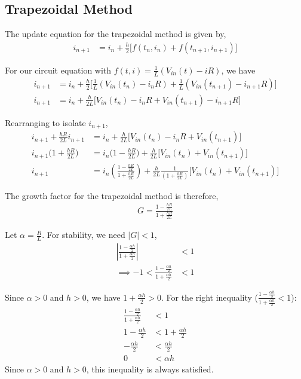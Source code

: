 \documentclass[12pt]{article}
\newcommand{\brak}[1]{\ensuremath{\left(#1\right)}}
\begin{document}
\subsection{Trapezoidal Method}
The update equation for the trapezoidal method is given by,
\begin{align*}
i_{n+1} &= i_n + \frac{h}{2} \Big[ f(t_n, i_n) + f(t_{n+1}, i_{n+1}) \Big]
\end{align*}

For our circuit equation with $f(t, i) = \frac{1}{L}(V_{in}(t) - iR)$, we have
\begin{align*}
i_{n+1} &= i_n + \frac{h}{2} \Big[ \frac{1}{L}(V_{in}(t_n) - i_n R) + \frac{1}{L}(V_{in}(t_{n+1}) - i_{n+1} R) \Big] \\
i_{n+1} &= i_n + \frac{h}{2L} \Big[ V_{in}(t_n) - i_n R + V_{in}(t_{n+1}) - i_{n+1} R \Big]
\end{align*}

Rearranging to isolate $i_{n+1}$,
\begin{align*}
i_{n+1} + \frac{hR}{2L}i_{n+1} &= i_n + \frac{h}{2L} \Big[ V_{in}(t_n) - i_n R + V_{in}(t_{n+1}) \Big] \\
i_{n+1}\Big(1 + \frac{hR}{2L}\Big) &= i_n\Big(1 - \frac{hR}{2L}\Big) + \frac{h}{2L} \Big[ V_{in}(t_n) + V_{in}(t_{n+1}) \Big] \\
i_{n+1} &= i_n\brak{\frac{1 - \frac{hR}{2L}}{1 + \frac{hR}{2L}}} + \frac{h}{2L}\frac{1}{\brak{1 + \frac{hR}{2L}}} \Big[ V_{in}(t_n) + V_{in}(t_{n+1}) \Big]
\end{align*}

The growth factor for the trapezoidal method is therefore,
\begin{align*}
G = \frac{1 - \frac{hR}{2L}}{1 + \frac{hR}{2L}}
\end{align*}

Let $\alpha = \frac{R}{L}$. For stability, we need $|G| < 1$,
\begin{align*}
\left|\frac{1 - \frac{\alpha h}{2}}{1 + \frac{\alpha h}{2}}\right| &< 1\\
\implies -1 < \frac{1 - \frac{\alpha h}{2}}{1 + \frac{\alpha h}{2}} &< 1
\end{align*}

Since $\alpha > 0$ and $h > 0$, we have $1 + \frac{\alpha h}{2} > 0$.\newline
For the right inequality ($\frac{1 - \frac{\alpha h}{2}}{1 + \frac{\alpha h}{2}} < 1$):
\begin{align*}
\frac{1 - \frac{\alpha h}{2}}{1 + \frac{\alpha h}{2}} &< 1 \\
1 - \frac{\alpha h}{2} &< 1 + \frac{\alpha h}{2} \\
-\frac{\alpha h}{2} &< \frac{\alpha h}{2} \\
0 &< \alpha h
\end{align*}
Since $\alpha > 0$ and $h > 0$, this inequality is always satisfied.
\end{document}
